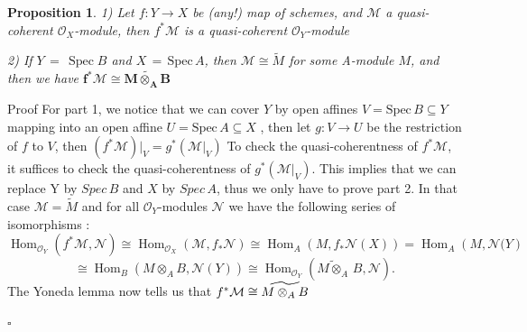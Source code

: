 \documentclass{article}
\newtheorem{proposition}[theorem]{Proposition}
\newenvironment{Proof}{{\noindent \indent \it Proof:\quad}}{\hfill $\square$\par}
\begin{document}
\begin{proposition} 
1) Let $f:Y\to X$ be (any!) map of schemes, and $\mathcal M$ a quasi-coherent ${\mathcal{O}}_{X}$-module, then $f^{\ast}\mathcal M$ is a quasi-coherent ${\mathcal{O}}_{Y}$-module

2) If $Y\,=\,\operatorname{Spec}B$ and $X\,=\,{\mathrm{Spec}}\,A$, then $\mathcal M\cong{\widetilde{{M}}}$ for some A-module $M$, and then we have $\bm{f^{\ast}\mathcal{M}\cong \widetilde{M\otimes_{A}B}}$ 
\label{prop 3.98}
\end{proposition}
\begin{Proof}
    Proof For part 1,  we notice that we can cover $Y$ by open affines $V={\mathrm{Spec}}\,B\subseteq Y$ mapping into an open affine $U={\mathrm{Spec}}\,A\subseteq X$ , then let $g:V\to U$ be the restriction of $f$ to $V$, then $(f^{\ast}\mathcal{M})|_{V}=g^{*}(\mathcal{M}|_{V})$ To check the quasi-coherentness of $f^{\ast}{\mathcal{M}}$, it suffices to check the quasi-coherentness of $g^{\ast}({\mathcal{M}}|_{V})$. This implies that we can replace Y by $Spec\,B$ and $X$ by $Spec\,A$,  thus we only have to prove part 2. 
In that case $\mathcal M=\widetilde M$ and for all ${\mathcal{O}}_{Y}$-modules $\mathcal N$ we have the following series of isomorphisms :
$$
\operatorname{Hom}_{\mathcal O_Y}(f^\ast \mathcal M,{\mathcal{N}})
\cong
\operatorname{Hom}_{\mathcal O_X}(\mathcal M,f_\ast{\mathcal{N}})
\cong
\operatorname{Hom}_{A}(M,f_\ast{\mathcal{N}(X)})
=
\operatorname{Hom}_{A}(M,{\mathcal{N}(Y})
$$
$$
\cong\operatorname{Hom}_{B}(M\otimes_{A}B,{\mathcal{N}}(Y))\cong\operatorname{Hom}_{\mathcal O_Y}({\widetilde{M\otimes_{A}}}\,B,{\mathcal{N}}). 
$$
The Yoneda lemma now tells us that $f^{\ast}{\cal M}\cong \widetilde{M\otimes_{A}B}$

\end{Proof}
\end{document}
